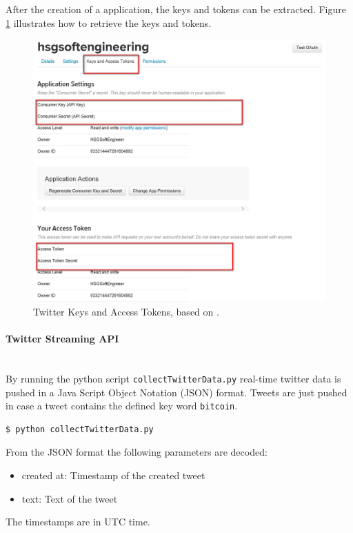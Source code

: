 \documentclass[a4paper,12pt]{article}
\begin{document}
\begin{spacing}{1.2}
After the creation of a application, the keys and tokens can be extracted. Figure \ref{figkeysandtokens} illustrates how to retrieve the keys and tokens.
\begin{figure}[H]
\centering
	\includegraphics[scale=0.6]{twitteraccess}
\caption{Twitter Keys and Access Tokens, based on \textcite{twitterinc2017c}.}
	\label{figkeysandtokens}
\end{figure}

\paragraph{Twitter Streaming API}\mbox{}\\{}
By running the python script \verb|collectTwitterData.py| real-time twitter data is pushed in a Java Script Object Notation (JSON) format. Tweets are just pushed in case a tweet contains the defined key word \verb|bitcoin|.
\begin{lstlisting}[language=bash]
$ python collectTwitterData.py
\end{lstlisting}

From the JSON format the following parameters are decoded:
\begin{itemize}
    \item created at: Timestamp of the created tweet
    \item text: Text of the tweet
\end{itemize}
The timestamps are in UTC time.


\end{spacing}
\end{document}
